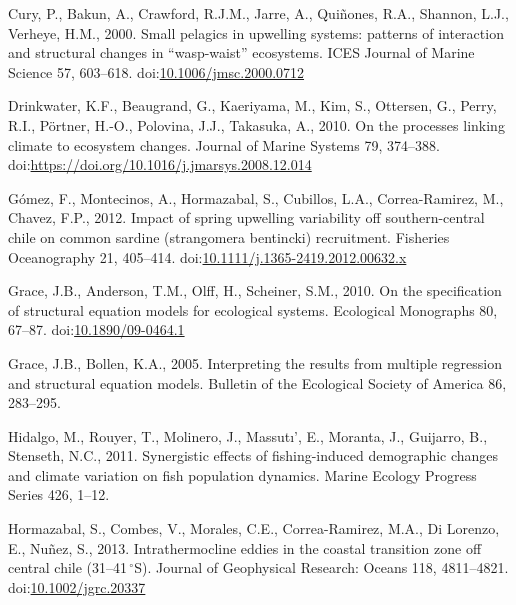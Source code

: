 \documentclass[12pt]{article}
\begin{document}
\leavevmode\hypertarget{ref-Cury2000}{}%
Cury, P., Bakun, A., Crawford, R.J.M., Jarre, A., Quiñones, R.A.,
Shannon, L.J., Verheye, H.M., 2000. Small pelagics in upwelling systems:
patterns of interaction and structural changes in ``wasp-waist''
ecosystems. ICES Journal of Marine Science 57, 603--618.
doi:\href{https://doi.org/10.1006/jmsc.2000.0712}{10.1006/jmsc.2000.0712}

\leavevmode\hypertarget{ref-DRINKWATER2010374}{}%
Drinkwater, K.F., Beaugrand, G., Kaeriyama, M., Kim, S., Ottersen, G.,
Perry, R.I., Pörtner, H.-O., Polovina, J.J., Takasuka, A., 2010. On the
processes linking climate to ecosystem changes. Journal of Marine
Systems 79, 374--388.
doi:\href{https://doi.org/https://doi.org/10.1016/j.jmarsys.2008.12.014}{https://doi.org/10.1016/j.jmarsys.2008.12.014}

\leavevmode\hypertarget{ref-Gomez:2012}{}%
Gómez, F., Montecinos, A., Hormazabal, S., Cubillos, L.A.,
Correa-Ramirez, M., Chavez, F.P., 2012. Impact of spring upwelling
variability off southern-central chile on common sardine (strangomera
bentincki) recruitment. Fisheries Oceanography 21, 405--414.
doi:\href{https://doi.org/10.1111/j.1365-2419.2012.00632.x}{10.1111/j.1365-2419.2012.00632.x}

\leavevmode\hypertarget{ref-Graceetal:2010}{}%
Grace, J.B., Anderson, T.M., Olff, H., Scheiner, S.M., 2010. On the
specification of structural equation models for ecological systems.
Ecological Monographs 80, 67--87.
doi:\href{https://doi.org/10.1890/09-0464.1}{10.1890/09-0464.1}

\leavevmode\hypertarget{ref-GraceBollen2005}{}%
Grace, J.B., Bollen, K.A., 2005. Interpreting the results from multiple
regression and structural equation models. Bulletin of the Ecological
Society of America 86, 283--295.

\leavevmode\hypertarget{ref-Hidalgo:2011aa}{}%
Hidalgo, M., Rouyer, T., Molinero, J., Massutı', E., Moranta, J.,
Guijarro, B., Stenseth, N.C., 2011. Synergistic effects of
fishing-induced demographic changes and climate variation on fish
population dynamics. Marine Ecology Progress Series 426, 1--12.

\leavevmode\hypertarget{ref-Hormazabal:2013}{}%
Hormazabal, S., Combes, V., Morales, C.E., Correa-Ramirez, M.A., Di
Lorenzo, E., Nuñez, S., 2013. Intrathermocline eddies in the coastal
transition zone off central chile (31--41\(\,^{\circ}\)S). Journal of
Geophysical Research: Oceans 118, 4811--4821.
doi:\href{https://doi.org/10.1002/jgrc.20337}{10.1002/jgrc.20337}
\end{document}
